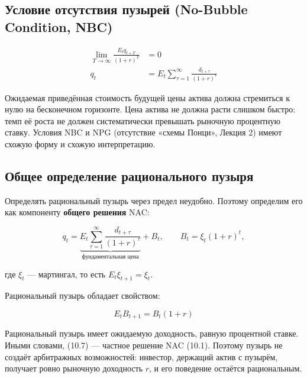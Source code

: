 \documentclass[10pt,a4paper]{article}
\begin{document}
\subsection{Условие отсутствия пузырей (No-Bubble Condition, NBC)}

\begin{formulabox}
\begin{align}
\lim_{T\to\infty}\frac{E_t q_{t+T}}{(1+r)^T} &= 0 \tag{10.4}\\
q_t &= E_t\sum_{\tau=1}^{\infty}\frac{d_{t+\tau}}{(1+r)^\tau} \tag{10.5}
\end{align}
\end{formulabox}

\begin{intuition}
Ожидаемая приведённая стоимость будущей цены актива должна стремиться к нулю на бесконечном горизонте. Цена актива не должна расти слишком быстро: темп её роста не должен систематически превышать рыночную процентную ставку. Условия NBC и NPG (отсутствие «схемы Понци», Лекция 2) имеют схожую форму и схожую интерпретацию.
\end{intuition}

\subsection{Общее определение рационального пузыря}

Определять рациональный пузырь через предел неудобно. Поэтому определим его как компоненту \textbf{общего решения} NAC:
\begin{formulabox}
\begin{equation}
q_t = \underbrace{E_t\sum_{\tau=1}^{\infty}\frac{d_{t+\tau}}{(1+r)^\tau}}_{\text{фундаментальная цена}} + B_t, \qquad B_t = \xi_t(1+r)^t, \tag{10.6}
\end{equation}
\end{formulabox}
где $\xi_t$ — мартингал, то есть $E_t\xi_{t+1}=\xi_t$.

Рациональный пузырь обладает свойством:
\begin{formulabox}
\begin{equation}
E_t B_{t+1} = B_t(1+r) \tag{10.7}
\end{equation}
\end{formulabox}

\begin{intuition}
Рациональный пузырь имеет ожидаемую доходность, равную процентной ставке. Иными словами, (10.7) — частное решение NAC (10.1). Поэтому пузырь не создаёт арбитражных возможностей: инвестор, держащий актив с пузырём, получает ровно рыночную доходность $r$, и его поведение остаётся рациональным.
\end{intuition}
\end{document}
